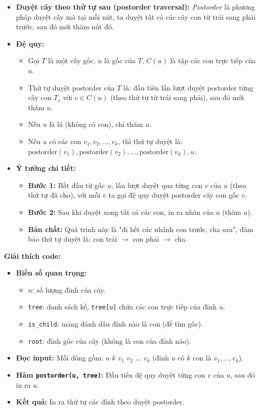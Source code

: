 \documentclass{article}
\begin{document}
\begin{itemize}
    \item \textbf{Duyệt cây theo thứ tự sau (postorder traversal):} \textit{Postorder} là phương pháp duyệt cây mà tại mỗi nút, ta duyệt tất cả các cây con từ trái sang phải trước, sau đó mới thăm nút đó.
    \item \textbf{Đệ quy:}
    \begin{itemize}
        \item Gọi $T$ là một cây gốc, $u$ là gốc của $T$, $C(u)$ là tập các con trực tiếp của $u$.
        \item Thứ tự duyệt postorder của $T$ là: đầu tiên lần lượt duyệt postorder từng cây con $T_v$ với $v \in C(u)$ (theo thứ tự từ trái sang phải), sau đó mới thăm $u$.
        \item Nếu $u$ là lá (không có con), chỉ thăm $u$.
        \item Nếu $u$ có các con $v_1, v_2, ..., v_k$, thì thứ tự duyệt là: $\text{postorder}(v_1), \text{postorder}(v_2), ..., \text{postorder}(v_k), u$.
    \end{itemize}
    \item \textbf{Ý tưởng chi tiết:}
    \begin{itemize}
        \item \textbf{Bước 1:} Bắt đầu từ gốc $u$, lần lượt duyệt qua từng con $v$ của $u$ (theo thứ tự đã cho), với mỗi $v$ ta gọi đệ quy duyệt postorder cây con gốc $v$.
        \item \textbf{Bước 2:} Sau khi duyệt xong tất cả các con, in ra nhãn của $u$ (thăm $u$).
        \item \textbf{Bản chất:} Quá trình này là "đi hết các nhánh con trước, cha sau", đảm bảo thứ tự duyệt là: con trái $\to$ con phải $\to$ cha.
    \end{itemize}
\end{itemize}

\textbf{Giải thích code:}

\begin{itemize}
    \item \textbf{Biến số quan trọng:}
    \begin{itemize}
        \item $n$: số lượng đỉnh của cây.
        \item \texttt{tree}: danh sách kề, \texttt{tree[u]} chứa các con trực tiếp của đỉnh $u$.
        \item \texttt{is\_child}: mảng đánh dấu đỉnh nào là con (để tìm gốc).
        \item \texttt{root}: đỉnh gốc của cây (không là con của đỉnh nào).
    \end{itemize}
    \item \textbf{Đọc input:} Mỗi dòng gồm: $u$ $k$ $v_1$ $v_2$ ... $v_k$ (đỉnh $u$ có $k$ con là $v_1, ..., v_k$).
    \item \textbf{Hàm \texttt{postorder(u, tree)}:} Đầu tiên đệ quy duyệt từng con $v$ của $u$, sau đó in ra $u$.
    \item \textbf{Kết quả:} In ra thứ tự các đỉnh theo duyệt postorder.
\end{itemize}
\end{document}
